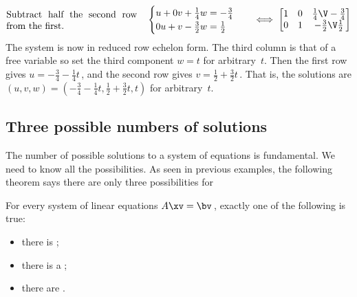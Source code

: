 \begin{example}
\begin{solution}
\begin{align*}
\parbox{0.4\linewidth}{Subtract half the second row from the first.}
\quad&
\begin{cases}
u+0v+\frac14w=-\frac34\\0u+v-\frac32w=\frac12
\end{cases}
&\iff
\begin{bmatrix} 1&0&\frac14\V-\frac34\\0&1&-\frac32\V\frac12 \end{bmatrix}
\end{align*}
The system is now in reduced row echelon form.  
The third column is that of a free variable so set the third component \(w=t\) for arbitrary~\(t\).
Then the first row gives \(u=-\frac34-\frac14t\)\,, and the second row gives \(v=\frac12+\frac32t\)\,.
That is, the solutions are \((u,v,w)=(-\frac34-\frac14t,\frac12+\frac32t,t)\) for arbitrary~\(t\).
\end{solution}
\end{example}




\subsection{Three possible numbers of solutions}
\label{sec:3pns}

The number of possible solutions to a system of equations is fundamental.  
We need to know all the possibilities.
As seen in previous examples, the following theorem says there are only three possibilities for 

\begin{theorem} \label{thm:fred}
For every system of linear equations \(A\xv=\bv\)\,, exactly one of the following is true:
\begin{itemize}
\item there is ;
\item there is a ;
\item there are .
\end{itemize}
\end{theorem}

